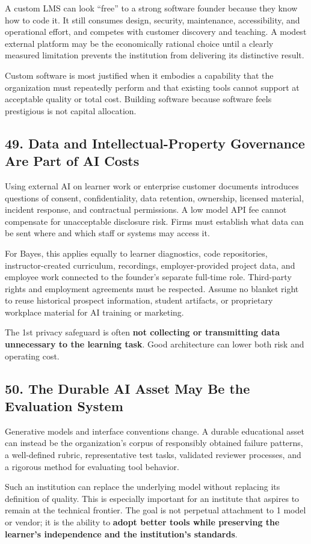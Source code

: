 A custom LMS can look ``free'' to a strong software founder because they know how to code it. It still consumes design, security, maintenance, accessibility, and operational effort, and competes with customer discovery and teaching. A modest external platform may be the economically rational choice until a clearly measured limitation prevents the institution from delivering its distinctive result.

Custom software is most justified when it embodies a capability that the organization must repeatedly perform and that existing tools cannot support at acceptable quality or total cost. Building software because software feels prestigious is not capital allocation.

\subsection*{49. Data and Intellectual-Property Governance Are Part of AI Costs}

Using external AI on learner work or enterprise customer documents introduces questions of consent, confidentiality, data retention, ownership, licensed material, incident response, and contractual permissions. A low model API fee cannot compensate for unacceptable disclosure risk. Firms must establish what data can be sent where and which staff or systems may access it.

For Bayes, this applies equally to learner diagnostics, code repositories, instructor-created curriculum, recordings, employer-provided project data, and employee work connected to the founder's separate full-time role. Third-party rights and employment agreements must be respected. Assume no blanket right to reuse historical prospect information, student artifacts, or proprietary workplace material for AI training or marketing.

The 1st privacy safeguard is often \textbf{not collecting or transmitting data unnecessary to the learning task}. Good architecture can lower both risk and operating cost.

\subsection*{50. The Durable AI Asset May Be the Evaluation System}

Generative models and interface conventions change. A durable educational asset can instead be the organization's corpus of responsibly obtained failure patterns, a well-defined rubric, representative test tasks, validated reviewer processes, and a rigorous method for evaluating tool behavior.

Such an institution can replace the underlying model without replacing its definition of quality. This is especially important for an institute that aspires to remain at the technical frontier. The goal is not perpetual attachment to 1 model or vendor; it is the ability to \textbf{adopt better tools while preserving the learner's independence and the institution's standards}.
